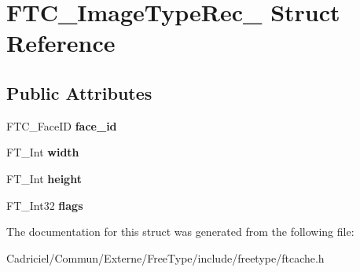 \hypertarget{struct_f_t_c___image_type_rec__}{}\section{F\+T\+C\+\_\+\+Image\+Type\+Rec\+\_\+ Struct Reference}
\label{struct_f_t_c___image_type_rec__}
\subsection*{Public Attributes}
\begin{DoxyCompactItemize}
\item 
F\+T\+C\+\_\+\+Face\+ID {\bfseries face\+\_\+id}\hypertarget{struct_f_t_c___image_type_rec___a9851b8d4a06baacd18d5b9856fd85abd}{}\label{struct_f_t_c___image_type_rec___a9851b8d4a06baacd18d5b9856fd85abd}

\item 
F\+T\+\_\+\+Int {\bfseries width}\hypertarget{struct_f_t_c___image_type_rec___af1a4cccbabb0f5852ed755a12ed08dd8}{}\label{struct_f_t_c___image_type_rec___af1a4cccbabb0f5852ed755a12ed08dd8}

\item 
F\+T\+\_\+\+Int {\bfseries height}\hypertarget{struct_f_t_c___image_type_rec___adb56a9d18a3f522d713d0ba01c1a8778}{}\label{struct_f_t_c___image_type_rec___adb56a9d18a3f522d713d0ba01c1a8778}

\item 
F\+T\+\_\+\+Int32 {\bfseries flags}\hypertarget{struct_f_t_c___image_type_rec___a391782ed8c67de86591c71f276ea6454}{}\label{struct_f_t_c___image_type_rec___a391782ed8c67de86591c71f276ea6454}

\end{DoxyCompactItemize}


The documentation for this struct was generated from the following file\+:\begin{DoxyCompactItemize}
\item 
Cadriciel/\+Commun/\+Externe/\+Free\+Type/include/freetype/ftcache.\+h\end{DoxyCompactItemize}
